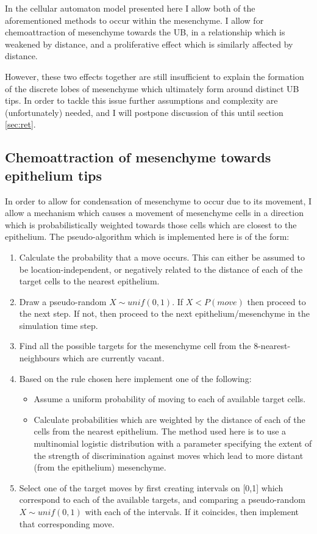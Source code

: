 \documentclass[pdftex,10pt,a4paper]{article}
\begin{document}
In the cellular automaton model presented here I allow both of the aforementioned methods to occur within the mesenchyme. I allow for chemoattraction of mesenchyme towards the UB, in a relationship which is weakened by distance, and a proliferative effect which is similarly affected by distance.

However, these two effects together are still insufficient to explain the formation of the discrete lobes of mesenchyme which ultimately form around distinct UB tips. In order to tackle this issue further assumptions and complexity are (unfortunately) needed, and I will postpone discussion of this until section \ref{sec:ret}.

\subsection{Chemoattraction of mesenchyme towards epithelium tips}\label{sec:activemesmove}
In order to allow for condensation of mesenchyme to occur due to its movement, I allow a mechanism which causes a movement of mesenchyme cells in a direction which is probabilistically weighted towards those cells which are closest to the epithelium. The pseudo-algorithm which is implemented here is of the form:

\begin{enumerate}
\item Calculate the probability that a move occurs. This can either be assumed to be location-independent, or negatively related to the distance of each of the target cells to the nearest epithelium.\label{point:mesactive}
\item Draw a pseudo-random $X\sim unif(0,1)$. If $X<P(move)$ then proceed to the next step. If not, then proceed to the next epithelium/mesenchyme in the simulation time step.
\item Find all the possible targets for the mesenchyme cell from the 8-nearest-neighbours which are currently vacant. 
\item Based on the rule chosen here implement one of the following:
\begin{itemize}
\item Assume a uniform probability of moving to each of available target cells.
\item Calculate probabilities which are weighted by the distance of each of the cells from the nearest epithelium. The method used here is to use a multinomial logistic distribution with a parameter specifying the extent of the strength of discrimination against moves which lead to more distant (from the epithelium) mesenchyme.\label{point:mesactive1}
\end{itemize}
\item Select one of the target moves by first creating intervals on [0,1] which correspond to each of the available targets, and comparing a pseudo-random $X\sim unif(0,1)$ with each of the intervals. If it coincides, then implement that corresponding move.
\end{enumerate}
\end{document}
